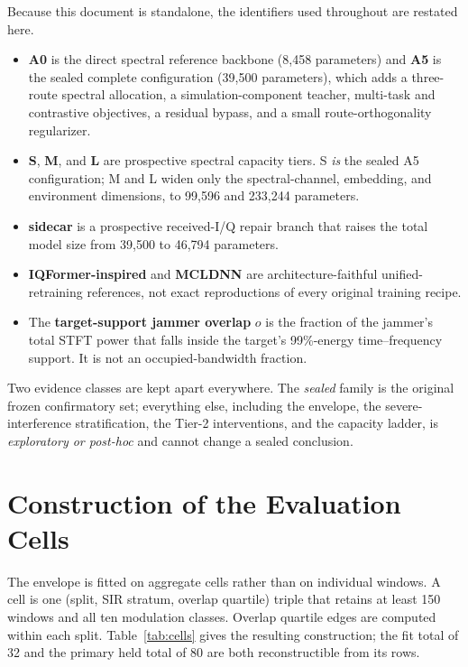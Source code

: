 \documentclass[letterpaper,onecolumn,11pt,journal]{IEEEtran}
\begin{document}
Because this document is standalone, the identifiers used throughout are
restated here.
\begin{itemize}
  \item \textbf{A0} is the direct spectral reference backbone (8{,}458
  parameters) and \textbf{A5} is the sealed complete configuration
  (39{,}500 parameters), which adds a three-route spectral allocation, a
  simulation-component teacher, multi-task and contrastive objectives, a
  residual bypass, and a small route-orthogonality regularizer.
  \item \textbf{S}, \textbf{M}, and \textbf{L} are prospective spectral
  capacity tiers. S \emph{is} the sealed A5 configuration; M and L widen only
  the spectral-channel, embedding, and environment dimensions, to
  99{,}596 and 233{,}244 parameters.
  \item \textbf{sidecar} is a prospective received-I/Q repair branch that
  raises the total model size from 39{,}500 to 46{,}794 parameters.
  \item \textbf{IQFormer-inspired} and \textbf{MCLDNN} are
  architecture-faithful unified-retraining references, not exact reproductions
  of every original training recipe.
  \item The \textbf{target-support jammer overlap} $o$ is the fraction of the
  jammer's total STFT power that falls inside the target's 99\%-energy
  time--frequency support. It is not an occupied-bandwidth fraction.
\end{itemize}

Two evidence classes are kept apart everywhere. The \emph{sealed} family is the
original frozen confirmatory set; everything else, including the envelope, the
severe-interference stratification, the Tier-2 interventions, and the capacity
ladder, is \emph{exploratory or post-hoc} and cannot change a sealed
conclusion.

\section{Construction of the Evaluation Cells}
The envelope is fitted on aggregate cells rather than on individual windows. A
cell is one (split, SIR stratum, overlap quartile) triple that retains at least
150 windows and all ten modulation classes. Overlap quartile edges are computed
within each split. Table~\ref{tab:cells} gives the resulting construction; the
fit total of 32 and the primary held total of 80 are both reconstructible from
its rows.
\end{document}

